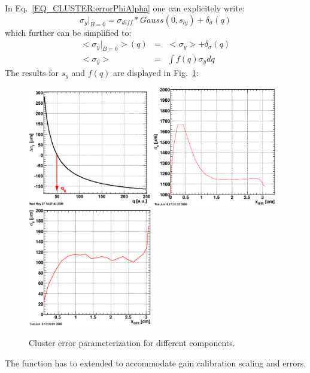 \documentclass{alicetdr}
\begin{document}
In Eq.~\ref{EQ_CLUSTER:errorPhiAlpha} one can explicitely write:
\begin{equation}
\sigma_{y}|_{B=0} = \sigma_{diff}*Gauss(0, s_{ly}) + \delta_{\sigma}(q)
\end{equation}
which further can be simplified to:
\begin{eqnarray}
<\sigma_{y}|_{B=0}>(q) &=& <\sigma_{y}> + \delta_{\sigma}(q)\\
<\sigma_{y}> &=& \int{f(q)\sigma_{y}dq}
\end{eqnarray}
The results for $s_y$ and $f(q)$ are displayed in Fig.~\ref{FIG_CLUSTER:errorCharge}:
\begin{figure}[htb]
\begin{center}
\includegraphics[width=0.48\textwidth]{plots/clusterQerror.eps}
\includegraphics[width=0.48\textwidth]{plots/clusterSX.eps}
\includegraphics[width=0.48\textwidth]{plots/clusterSY.eps}
\end{center}
\caption{
Cluster error parameterization for different components.}
\label{FIG_CLUSTER:errorCharge}
\end{figure}
The function has to extended to accommodate gain calibration scaling and errors.
\end{document}
